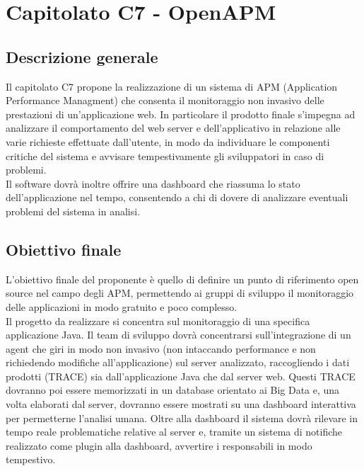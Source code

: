 \documentclass[StudioDiFattibilità.tex]{subfiles}
\begin{document}
\chapter{Capitolato C7 - OpenAPM}
\section{Descrizione generale}
Il capitolato C7 propone la realizzazione di un sistema di APM (Application Performance Managment) che consenta il monitoraggio non invasivo delle prestazioni di un'applicazione web. In particolare il prodotto finale s'impegna ad analizzare il comportamento del web server e dell'applicativo in relazione alle varie richieste effettuate dall'utente, in modo da individuare le componenti critiche del sistema e avvisare tempestivamente gli sviluppatori in caso di problemi.\\
Il software dovrà inoltre offrire una dashboard che riassuma lo stato dell'applicazione nel tempo, consentendo a chi di dovere di analizzare eventuali problemi del sistema in analisi.
\section{Obiettivo finale}
L'obiettivo finale del proponente è quello di definire un punto di riferimento open source nel campo degli APM, permettendo ai gruppi di sviluppo il monitoraggio delle applicazioni in modo gratuito e poco complesso.\\
Il progetto da realizzare si concentra sul monitoraggio di una specifica applicazione Java. Il team di sviluppo dovrà concentrarsi sull'integrazione di un agent che giri in modo non invasivo (non intaccando performance e non richiedendo modifiche all'applicazione) sul server analizzato, raccogliendo i dati prodotti (TRACE) sia dall'applicazione Java che dal server web. Questi TRACE dovranno poi essere memorizzati in un database orientato ai Big Data e, una volta elaborati dal server, dovranno essere mostrati su una dashboard interattiva per permetterne l'analisi umana. Oltre alla dashboard il sistema dovrà rilevare in tempo reale problematiche relative al server e, tramite un sistema di notifiche realizzato come plugin alla dashboard, avvertire i responsabili in modo tempestivo.
\end{document}
